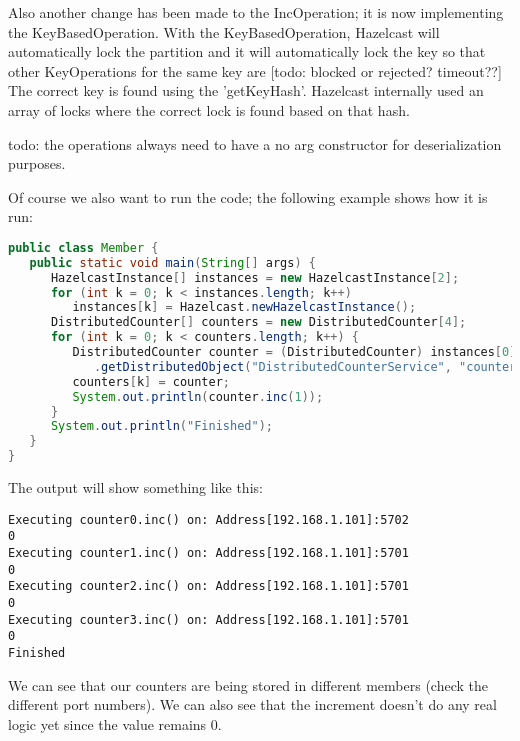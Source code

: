 Also another change has been made to the IncOperation; it is now implementing the KeyBasedOperation. With the KeyBasedOperation, Hazelcast will automatically lock the partition and it will automatically lock the key so that other KeyOperations for the same key are [todo: blocked or rejected? timeout??] The correct key is found using the 'getKeyHash'. Hazelcast internally used an array of locks where the correct lock is found based on that hash. 

todo: the operations always need to have a no arg constructor for deserialization purposes. 

Of course we also want to run the code; the following example shows how it is run:
\begin{lstlisting}[language=java]
public class Member {
   public static void main(String[] args) {
      HazelcastInstance[] instances = new HazelcastInstance[2];
      for (int k = 0; k < instances.length; k++) 
         instances[k] = Hazelcast.newHazelcastInstance();
      DistributedCounter[] counters = new DistributedCounter[4];
      for (int k = 0; k < counters.length; k++) {
         DistributedCounter counter = (DistributedCounter) instances[0]
            .getDistributedObject("DistributedCounterService", "counter" + k);
         counters[k] = counter;
         System.out.println(counter.inc(1));
      }
      System.out.println("Finished");
   }
}
\end{lstlisting}

The output will show something like this:
\begin{lstlisting}
Executing counter0.inc() on: Address[192.168.1.101]:5702
0
Executing counter1.inc() on: Address[192.168.1.101]:5701
0
Executing counter2.inc() on: Address[192.168.1.101]:5701
0
Executing counter3.inc() on: Address[192.168.1.101]:5701
0
Finished
\end{lstlisting}
We can see that our counters are being stored in different members (check the different port numbers). We can also see that the increment doesn't do any real logic yet since the value remains 0.

